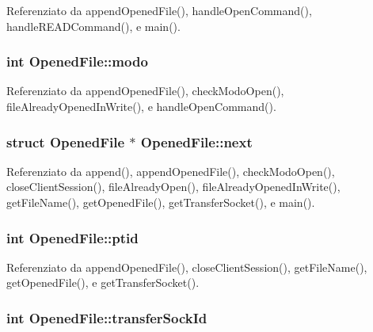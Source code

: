 Referenziato da append\+Opened\+File(), handle\+Open\+Command(), handle\+R\+E\+A\+D\+Command(), e main().

\hypertarget{structOpenedFile_a6d9f22ff6ba81506ba9c4a60f27c4f32}{
\subsubsection[{modo}]{\setlength{\rightskip}{0pt plus 5cm}int Opened\+File\+::modo}}\label{structOpenedFile_a6d9f22ff6ba81506ba9c4a60f27c4f32}


Referenziato da append\+Opened\+File(), check\+Modo\+Open(), file\+Already\+Opened\+In\+Write(), e handle\+Open\+Command().

\hypertarget{structOpenedFile_a9b8c8b995cdda6da249a6ce9a9df98b2}{
\subsubsection[{next}]{\setlength{\rightskip}{0pt plus 5cm}struct {\bf Opened\+File} $\ast$ Opened\+File\+::next}}\label{structOpenedFile_a9b8c8b995cdda6da249a6ce9a9df98b2}


Referenziato da append(), append\+Opened\+File(), check\+Modo\+Open(), close\+Client\+Session(), file\+Already\+Open(), file\+Already\+Opened\+In\+Write(), get\+File\+Name(), get\+Opened\+File(), get\+Transfer\+Socket(), e main().

\hypertarget{structOpenedFile_aba1e9ae457adfa6a9cc6a22ca4ee290d}{
\subsubsection[{ptid}]{\setlength{\rightskip}{0pt plus 5cm}int Opened\+File\+::ptid}}\label{structOpenedFile_aba1e9ae457adfa6a9cc6a22ca4ee290d}


Referenziato da append\+Opened\+File(), close\+Client\+Session(), get\+File\+Name(), get\+Opened\+File(), e get\+Transfer\+Socket().

\hypertarget{structOpenedFile_a122a7d3d722dc1f7c63857af2024f098}{
\subsubsection[{transfer\+Sock\+Id}]{\setlength{\rightskip}{0pt plus 5cm}int Opened\+File\+::transfer\+Sock\+Id}}\label{structOpenedFile_a122a7d3d722dc1f7c63857af2024f098}


